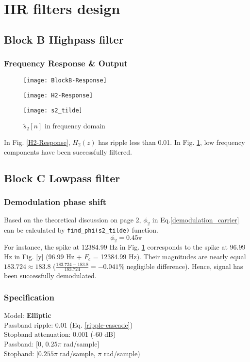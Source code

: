 \documentclass{article}
\newenvironment{homeworkProblem}[1]{
	\section{#1}
	}{
}
\newenvironment{homeworkSection}[1]{
	\subsection{#1}
	}{
}
\begin{document}
\begin{homeworkProblem}{IIR filters design}
\begin{homeworkSection}{Block B Highpass filter}
\subsubsection{Frequency Response \& Output}
\begin{figure}[H]
\begin{minipage}[t]{0.33\linewidth}
\centering
\texttt{[image: BlockB-Response]}
\caption{Block B response}
\label{BlockB-Response}
\end{minipage}
\begin{minipage}[t]{0.33\linewidth}
\centering
\texttt{[image: H2-Response]}
\caption{$H_2(z)$ Response}
\label{H2-Response}
\end{minipage}
\begin{minipage}[t]{0.33\linewidth}
\centering
\texttt{[image: s2\_tilde]}
\caption{$\tilde{s}_2[n]$ in frequency domain}
\label{s2_tilde}
\end{minipage}
\end{figure}

In Fig. \ref{H2-Response}, $H_2(z)$ has ripple less than 0.01. In Fig. \ref{s2_tilde}, low frequency components have been successfully filtered.

\end{homeworkSection}


\begin{homeworkSection}{Block C Lowpass filter}

\subsubsection{Demodulation phase shift}
Based on the theoretical discussion on page 2, $\phi_2$ in Eq.\ref{demodulation_carrier} can be calculated by \texttt{find\_phi(s2\_tilde)} function.
\begin{equation}
\phi_2 = 0.45 \pi
\end{equation}
For instance, the spike at 12384.99 Hz in Fig. \ref{s2_tilde} corresponds to the spike at 96.99 Hz in Fig. \ref{y} (96.99 Hz + $F_c$ = 12384.99 Hz). Their magnitudes are nearly equal $183.724 \approx 183.8$ ($\frac{183.724 - 183.8}{183.724} = -0.041\%$ negligible difference). Hence, signal has been successfully demodulated.

\subsubsection{Specification}
Model: \textbf{Elliptic}\\
Passband ripple: 0.01 (Eq. \ref{ripple-cascade})\\
Stopband attenuation: 0.001 (-60 dB)\\
Passband: [0, $0.25\pi$ rad/sample]\\
Stopband: [$0.255\pi$ rad/sample, $\pi$ rad/sample)\\


\end{homeworkSection}
\end{homeworkProblem}
\end{document}

